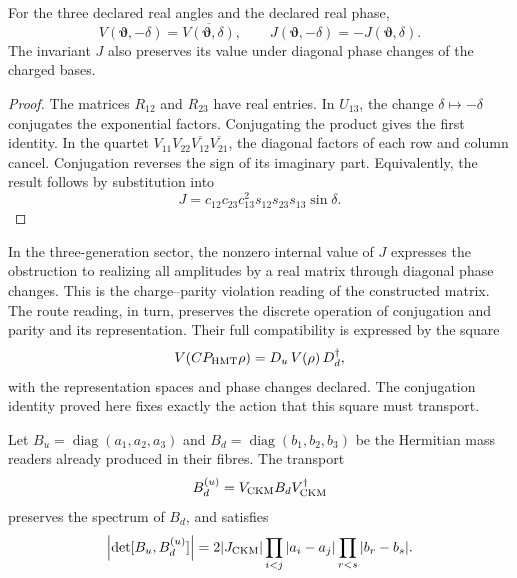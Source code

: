 \begin{proposition}
\label{ii:prop:ii09-conjugacion-unitaria}
For the three declared real angles and the declared real phase,
\[
 V(\boldsymbol\vartheta,-\delta)
       =\overline{V(\boldsymbol\vartheta,\delta)},
 \qquad
 J(\boldsymbol\vartheta,-\delta)
       =-J(\boldsymbol\vartheta,\delta).
\]
The invariant \(J\) also preserves its value under diagonal
phase changes of the charged bases.
\end{proposition}
\begin{proof}
The matrices \(R_{12}\) and \(R_{23}\) have real entries.
In \(U_{13}\), the change \(\delta\mapsto-\delta\) conjugates
the exponential factors. Conjugating the product gives the
first identity. In the quartet
\(V_{11}V_{22}\overline{V_{12}}\overline{V_{21}}\), the
diagonal factors of each row and column cancel. Conjugation
reverses the sign of its imaginary part. Equivalently, the
result follows by substitution into
\[
 J=c_{12}c_{23}c_{13}^{2}s_{12}s_{23}s_{13}\sin\delta.
\]
\end{proof}

In the three-generation sector, the nonzero internal value of
\(J\) expresses the obstruction to realizing all amplitudes
by a real matrix through diagonal phase changes. This
is the charge--parity violation reading of the constructed
matrix. The route reading, in turn, preserves the discrete
operation of conjugation and parity and its representation. Their
full compatibility is expressed by the square
\[
 \mathcal V(CP_{\rm HMT}\rho)
  =D_u\,\overline{\mathcal V(\rho)}\,D_d^{\dagger},
\]
with the representation spaces and phase changes
declared. The conjugation identity proved here fixes
exactly the action that this square must transport.



\begin{proposition}
Let \(B_u=\operatorname{diag}(a_1,a_2,a_3)\) and \(B_d=\operatorname{diag}(b_1,b_2,b_3)\) be the Hermitian mass readers already produced in their fibres. The transport
\begin{equation}
 B_d^{(u)}=V_{\rm CKM}B_dV_{\rm CKM}^{\dagger}
 \label{ii:eq:ii-ckm-mass-transport}
\end{equation}
preserves the spectrum of \(B_d\), and satisfies
\begin{equation}
 \left|\det[B_u,B_d^{(u)}]\right|
 =2|J_{\rm CKM}|
   \prod_{i<j}|a_i-a_j|\prod_{r<s}|b_r-b_s|.
 \label{ii:eq:ii-ckm-commutator}
\end{equation}
\end{proposition}

